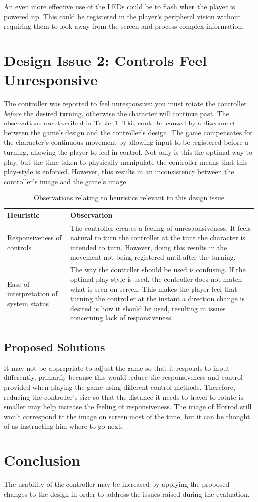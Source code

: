 \documentclass{scrartcl}
\begin{document}
An even more effective use of the LEDs could be to flash when the player is powered up. This could be registered in the player's peripheral vision without requiring them to look away from the screen and process complex information.

\section{Design Issue 2: Controls Feel Unresponsive}
The controller was reported to feel unresponsive: you must rotate the controller \textit{before} the desired turning, otherwise the character will continue past. The observations are described in Table~\ref{table:issue2}. This could be caused by a disconnect between the game's design and the controller's design. The game compensates for the character's continuous movement by allowing input to be registered before a turning, allowing the player to feel in control. Not only is this the optimal way to play, but the time taken to physically manipulate the controller means that this play-style is enforced. However, this results in an inconsistency between the controller's image and the game's image.

\begin{table}
\centering
\begin{tabular}{| p{6cm} | p{6cm} |}
\hline
\textbf{Heuristic} & \textbf{Observation} \\ \hline
Responsiveness of controls
 & The controller creates a feeling of unresponsiveness. It feels natural to turn the controller at the time the character is intended to turn. However, doing this results in the movement not being registered until after the turning. \\ \hline
Ease of interpretation of system status
 & The way the controller should be used is confusing. If the optimal play-style is used, the controller does not match what is seen on screen. This makes the player feel that turning the controller at the instant a direction change is desired is how it should be used, resulting in issues concerning lack of responsiveness. \\ \hline
\end{tabular}
\caption{Observations relating to heuristics relevant to this design issue}
\label{table:issue2}
\end{table}

\subsection{Proposed Solutions}
It may not be appropriate to adjust the game so that it responds to input differently, primarily because this would reduce the responsiveness and control provided when playing the game using different control methods. Therefore, reducing the controller's size so that the distance it needs to travel to rotate is smaller may help increase the feeling of responsiveness. The image of Hotrod still won't correspond to the image on screen most of the time, but it can be thought of as instructing him where to go next.

\section{Conclusion}
The usability of the controller may be increased by applying the proposed changes to the design in order to address the issues raised during the evaluation.



\end{document}
